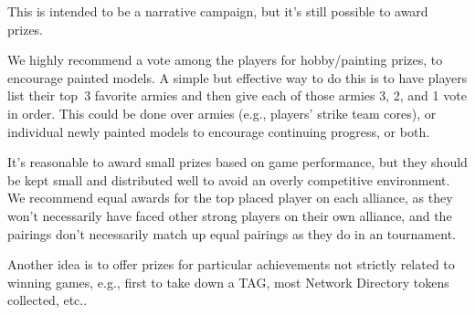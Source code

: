 \documentclass{tokh}
\begin{document}
This is intended to be a narrative campaign, but it's still possible
to award prizes.

We highly recommend a vote among the players for hobby/painting
prizes, to encourage painted models.  A simple but effective way to do
this is to have players list their top~3 favorite armies and then give
each of those armies 3, 2, and 1 vote in order.  This could be done
over armies (e.g., players' strike team cores), or individual newly
painted models to encourage continuing progress, or both.

It's reasonable to award small prizes based on game performance, but
they should be kept small and distributed well to avoid an overly
competitive environment.  We recommend equal awards for the top placed
player on each alliance, as they won't necessarily have faced other
strong players on their own alliance, and the pairings don't
necessarily match up equal pairings as they do in an tournament.

Another idea is to offer prizes for particular achievements not
strictly related to winning games, e.g., first to take down a TAG,
most Network Directory tokens collected, etc..
\end{document}
